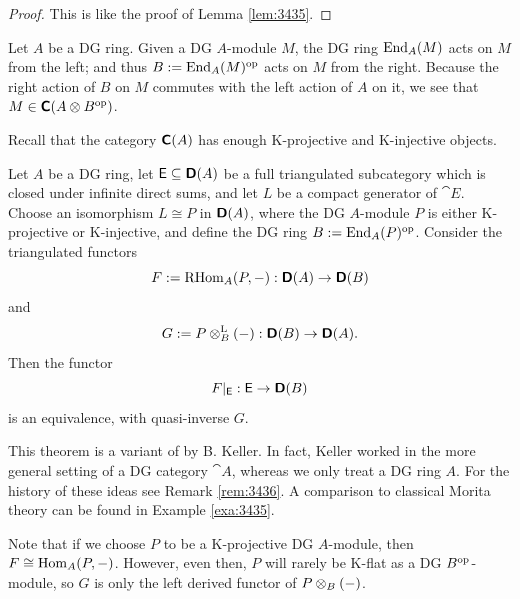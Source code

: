 \begin{proof}
This is like the proof of Lemma \ref{lem:3435}.
\end{proof}

Let $A$ be a DG ring. Given a DG $A$-module $M$, the DG ring 
$\operatorname{End}_A(M)$ acts on $M$ from the left; and thus 
$B := \operatorname{End}_A(M)^{\mathrm{op}}$ 
acts on $M$ from the right. Because the right action of $B$ on $M$ commutes 
with the left action of $A$ on it, we see that 
$M \in \boldsymbol{\mathsf{C}}(A \otimes B^{\mathrm{op}})$.

Recall that the category $\boldsymbol{\mathsf{C}}(A)$ has enough K-projective and K-injective 
objects. 

\begin{thm} \label{thm:3430}
Let $A$ be a DG ring, let 
$\operatorname{\mathsf{E}} \subseteq \boldsymbol{\mathsf{D}}(A)$ be a full triangulated subcategory which is closed 
under infinite direct sums, and let $L$ be a compact 
generator of $\cat{E}$. Choose an isomorphism 
$L \cong P$ in $\boldsymbol{\mathsf{D}}(A)$, where the DG $A$-module $P$ is either 
K-projective or K-injective, and define the DG ring
$B := \operatorname{End}_A(P)^{\mathrm{op}}$.
Consider the triangulated functors 
\[ F := \operatorname{RHom}_A(P, -) : \boldsymbol{\mathsf{D}}(A) \to \boldsymbol{\mathsf{D}}(B) \] 
and 
\[ G := P \otimes_B^{\mathrm{L}} (-) : \boldsymbol{\mathsf{D}}(B) \to \boldsymbol{\mathsf{D}}(A) . \]
Then the functor 
\[ F|_{\operatorname{\mathsf{E}}} : \operatorname{\mathsf{E}} \to \boldsymbol{\mathsf{D}}(B) \]
is an equivalence, with quasi-inverse $G$. 
\end{thm}

This theorem is a variant of \cite[Theorem 8.2]{Kel1} by B. Keller.
In fact, Keller worked in the more general setting of a DG category $\cat{A}$, 
whereas we only treat a DG ring $A$. For the history of these ideas see Remark 
\ref{rem:3436}.
A comparison to classical Morita theory can be found in Example \ref{exa:3435}.

Note that if we choose $P$ to be a K-projective DG $A$-module, then 
$F \cong \lb \opn{Hom}_A(P, -)$. 
However, even then, $P$ will rarely be K-flat as a DG $B^{\mathrm{op}}$-module, so 
$G$ is only the left derived functor of $P \otimes_B (-)$. 

